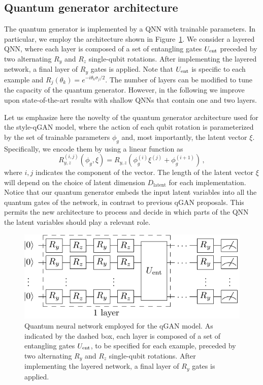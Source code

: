 \documentclass[twocolumn,preprintnumbers,superscriptaddress]{revtex4-2}
\begin{document}
\subsection{Quantum generator architecture}
The quantum generator is implemented by a QNN with trainable parameters. In particular, we employ the architecture shown in Figure~\ref{fig:circuit}. We consider a layered QNN, where each layer is composed of a set of entangling gates $U_{\rm ent}$ preceded by two alternating $R_y$ and $R_z$ single-qubit rotations. After implementing the layered network, a final layer of $R_y$ gates is applied. Note that $U_{\rm ent}$ is specific to each example and $R_j(\theta_k) = e^{-i\theta_k \sigma_j /2}$. The number of layers can be modified to tune the capacity of the quantum generator. However, in the following we improve upon state-of-the-art results with shallow QNNs that contain one and two layers.

Let us emphasize here the novelty of the quantum generator architecture used for the style-qGAN model, where the action of each qubit rotation is parameterized by the set of trainable parameters $\phi_g$ and, most importantly, the latent vector $\xi$. Specifically, we encode them by using a linear function as
\begin{equation}
    \label{eq:rotation} R_{y,z}^{(i,j)}\left(\phi_g, \xi\right) = R_{y,z}\left(\phi_g^{(i)} \xi^{(j)} + \phi_g^{(i+1)}\right)\,,
\end{equation}
where $i,j$ indicates the component of the vector. The length of the latent vector $\xi$ will depend on the choice of latent dimension $D_{\mathrm{latent}}$ for each implementation. Notice that our quantum generator embeds the input latent variables into all the quantum gates of the network, in contrast to previous qGAN proposals. This permits the new architecture to process and decide in which
parts of the QNN the latent variables should play a relevant role.

\begin{figure}
  \includegraphics[width=1.0\columnwidth]{plots/ansatz1.pdf}
  \caption{\label{fig:circuit}Quantum neural network employed for the qGAN model. As indicated by the dashed box, each layer is composed of a set of entangling gates $U_{\rm ent}$, to be specified for each example, preceded by two alternating $R_y$ and $R_z$ single-qubit rotations. After implementing the layered network, a final layer of $R_y$ gates is applied.}
\end{figure}
\end{document}
